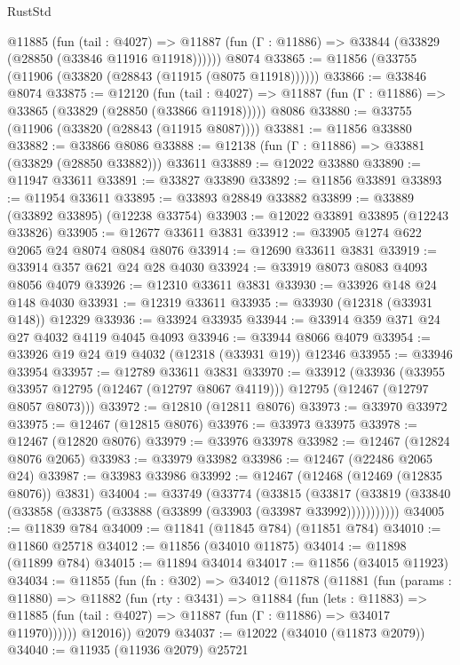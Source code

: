 \begin{lexlean}{RustStd}
\begin{coremodule}
    @11885
      (fun (tail : @4027) =>
      @11887 (fun (Γ : @11886) => @33844 (@33829 (@28850 (@33846 @11916 @11918))))))
    @8074
@33865 := @11856 (@33755 (@11906 (@33820 (@28843 (@11915 (@8075 @11918))))))
@33866 := @33846 @8074
@33875 := @12120
    (fun (tail : @4027) => @11887 (fun (Γ : @11886) => @33865 (@33829 (@28850 (@33866 @11918)))))
    @8086
@33880 := @33755 (@11906 (@33820 (@28843 (@11915 @8087))))
@33881 := @11856 @33880
@33882 := @33866 @8086
@33888 := @12138 (fun (Γ : @11886) => @33881 (@33829 (@28850 @33882))) @33611
@33889 := @12022 @33880
@33890 := @11947 @33611
@33891 := @33827 @33890
@33892 := @11856 @33891
@33893 := @11954 @33611
@33895 := @33893 @28849 @33882
@33899 := @33889 (@33892 @33895) (@12238 @33754)
@33903 := @12022 @33891 @33895 (@12243 @33826)
@33905 := @12677 @33611 @3831
@33912 := @33905 @1274 @622 @2065 @24 @8074 @8084 @8076
@33914 := @12690 @33611 @3831
@33919 := @33914 @357 @621 @24 @28 @4030
@33924 := @33919 @8073 @8083 @4093 @8056 @4079
@33926 := @12310 @33611 @3831
@33930 := @33926 @148 @24 @148 @4030
@33931 := @12319 @33611
@33935 := @33930 (@12318 (@33931 @148)) @12329
@33936 := @33924 @33935
@33944 := @33914 @359 @371 @24 @27 @4032 @4119 @4045 @4093
@33946 := @33944 @8066 @4079
@33954 := @33926 @19 @24 @19 @4032 (@12318 (@33931 @19)) @12346
@33955 := @33946 @33954
@33957 := @12789 @33611 @3831
@33970 := @33912
    (@33936
      (@33955 @33957 @12795 (@12467 (@12797 @8067 @4119)))
      @12795
      (@12467 (@12797 @8057 @8073)))
@33972 := @12810 (@12811 @8076)
@33973 := @33970 @33972
@33975 := @12467 (@12815 @8076)
@33976 := @33973 @33975
@33978 := @12467 (@12820 @8076)
@33979 := @33976 @33978
@33982 := @12467 (@12824 @8076 @2065)
@33983 := @33979 @33982
@33986 := @12467 (@22486 @2065 @24)
@33987 := @33983 @33986
@33992 := @12467 (@12468 (@12469 (@12835 @8076)) @3831)
@34004 := @33749
    (@33774
      (@33815
        (@33817 (@33819 (@33840 (@33858 (@33875 (@33888 (@33899 (@33903 (@33987 @33992)))))))))))
@34005 := @11839 @784
@34009 := @11841 (@11845 @784) (@11851 @784)
@34010 := @11860 @25718
@34012 := @11856 (@34010 @11875)
@34014 := @11898 (@11899 @784)
@34015 := @11894 @34014
@34017 := @11856 (@34015 @11923)
@34034 := @11855
    (fun (fn : @302) =>
    @34012
      (@11878
        (@11881
          (fun (params : @11880) =>
          @11882
            (fun (rty : @3431) =>
            @11884
              (fun (lets : @11883) =>
              @11885 (fun (tail : @4027) => @11887 (fun (Γ : @11886) => @34017 @11970))))))
        @12016))
    @2079
@34037 := @12022 (@34010 (@11873 @2079))
@34040 := @11935 (@11936 @2079) @25721

\end{coremodule}
\end{lexlean}
